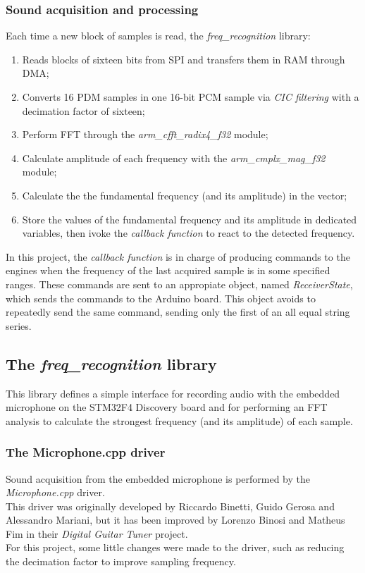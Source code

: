 \subsubsection{Sound acquisition and processing}
Each time a new block of samples is read, the \textit{freq\_recognition} library:
\begin{enumerate}
	\item Reads blocks of sixteen bits from SPI and transfers them in RAM through DMA;
	\item Converts 16 PDM samples in one 16-bit PCM sample via \textit{CIC filtering} with a decimation factor of sixteen;
	\item Perform FFT through the \textit{arm\_cfft\_radix4\_f32} module;
	\item Calculate amplitude of each frequency with the \textit{arm\_cmplx\_mag\_f32} module;
	\item Calculate the the fundamental frequency (and its amplitude) in the vector;
	\item Store the values of the fundamental frequency and its amplitude in dedicated variables, then ivoke the \textit{callback function} to react to the detected frequency.
\end{enumerate}
In this project, the \textit{callback function} is in charge of producing commands to the engines when the frequency of the last acquired sample is in some specified ranges. These commands are sent to an appropiate object, named \textit{ReceiverState}, which sends the commands to the Arduino board. This object avoids to repeatedly send the same command, sending only the first of an all equal string series.


\subsection{The \textit{freq\_recognition} library}
This library defines a simple interface for recording audio with the embedded microphone on the STM32F4 Discovery board and for performing an FFT analysis to calculate the strongest frequency (and its amplitude) of each sample.

\subsubsection{The Microphone.cpp driver}
Sound acquisition from the embedded microphone is performed by the \textit{Microphone.cpp} driver. \\
This driver was originally developed by Riccardo Binetti, Guido Gerosa and Alessandro Mariani, but it has been improved by Lorenzo Binosi and Matheus Fim in their \textit{Digital Guitar Tuner} project. \\
For this project, some little changes were made to the driver, such as reducing the decimation factor to improve sampling frequency.

